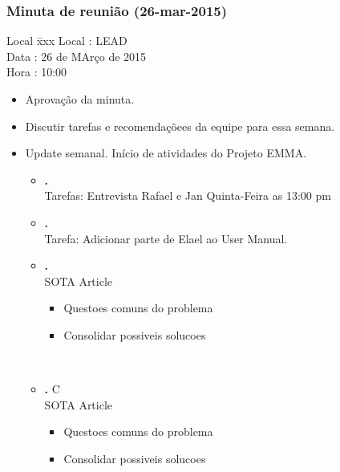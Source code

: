 \subsubsection{Minuta de reunião (26-mar-2015)}

\begin{tabbing}
  Local \= xxx \kill
  Local \> : LEAD \\
  Data  \> : 26 de MArço de 2015 \\
  Hora  \> : 10:00
\end{tabbing}


\begin{itemize}
  \item Aprovação da minuta.

  \item Discutir tarefas e recomendaçõees da equipe para essa semana.


  \item Update semanal. Início de atividades do Projeto EMMA.
  \begin{itemize}

    \item \textbf{\alana.} \\ Tarefas: Entrevista Rafael e Jan Quinta-Feira as 13:00 pm \\
    
    \item \textbf{\renan.} 
           \\Tarefa: Adicionar parte de Elael ao User Manual.\\

    \item \textbf{\elael.} 
    		\\SOTA Article
    		\begin{itemize}    
			 \item Questoes comuns do problema
			 \item Consolidar possiveis solucoes 
			\end {itemize}
			\\

    \item \textbf{\gabriel.} C\\SOTA Article
    		\begin{itemize}    
			 \item Questoes comuns do problema
			 \item Consolidar possiveis solucoes 
			\end {itemize}
			\\
  \end{itemize}


\end{itemize}
